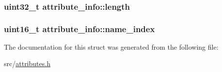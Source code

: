 \subsubsection[{\texorpdfstring{length}{length}}]{\setlength{\rightskip}{0pt plus 5cm}uint32\+\_\+t attribute\+\_\+info\+::length}\hypertarget{structattribute__info_a9528b298d46309f571f1f58c84cbd57c}{}\label{structattribute__info_a9528b298d46309f571f1f58c84cbd57c}
\subsubsection[{\texorpdfstring{name\+\_\+index}{name_index}}]{\setlength{\rightskip}{0pt plus 5cm}uint16\+\_\+t attribute\+\_\+info\+::name\+\_\+index}\hypertarget{structattribute__info_a7e925cf3d7a72731f1b6a6e4d1c24cc2}{}\label{structattribute__info_a7e925cf3d7a72731f1b6a6e4d1c24cc2}


The documentation for this struct was generated from the following file\+:\begin{DoxyCompactItemize}
\item 
src/\hyperlink{attributes_8h}{attributes.\+h}\end{DoxyCompactItemize}
